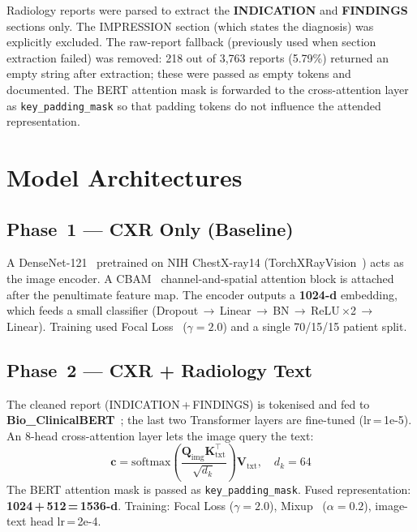 \documentclass{article}
\begin{document}
Radiology reports were parsed to extract the \textbf{INDICATION} and
\textbf{FINDINGS} sections only.
The IMPRESSION section (which states the diagnosis) was explicitly excluded.
The raw-report fallback (previously used when section extraction failed)
was removed: 218 out of 3,763 reports (5.79\%) returned an empty string
after extraction; these were passed as empty tokens and documented.
The BERT attention mask is forwarded to the cross-attention layer as
\texttt{key\_padding\_mask} so that padding tokens do not influence the
attended representation.

\section{Model Architectures}

\subsection{Phase~1 — CXR Only (Baseline)}

A DenseNet-121~\cite{huang2017densenet} pretrained on NIH ChestX-ray14
(TorchXRayVision~\cite{cohen2022torchxrayvision}) acts as the image encoder.
A CBAM~\cite{woo2018cbam} channel-and-spatial attention block is attached
after the penultimate feature map.
The encoder outputs a \textbf{1024-d} embedding, which feeds a small
classifier (Dropout\,$\to$\,Linear\,$\to$\,BN\,$\to$\,ReLU\,$\times$2\,$\to$\,Linear).
Training used Focal Loss~\cite{lin2017focal} ($\gamma=2.0$) and a single
70/15/15 patient split.

\subsection{Phase~2 — CXR + Radiology Text}

The cleaned report (INDICATION\,+\,FINDINGS) is tokenised and fed to
\textbf{Bio\_ClinicalBERT}~\cite{alsentzer2019bert}; the last two Transformer
layers are fine-tuned (lr\,=\,1e-5).
An 8-head cross-attention layer lets the image query the text:
\begin{equation}
  \mathbf{c} = \mathrm{softmax}\!\left(\frac{\mathbf{Q}_{\mathrm{img}}
  \mathbf{K}_{\mathrm{txt}}^\top}{\sqrt{d_k}}\right)\mathbf{V}_{\mathrm{txt}},
  \quad d_k = 64
  \label{eq:crossattn}
\end{equation}
The BERT attention mask is passed as \texttt{key\_padding\_mask}.
Fused representation: \textbf{1024\,+\,512\,=\,1536-d}.
Training: Focal Loss ($\gamma=2.0$), Mixup~\cite{zhang2018mixup} ($\alpha=0.2$),
image-text head lr\,=\,2e-4.
\end{document}
